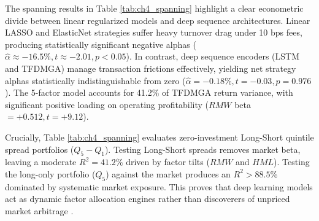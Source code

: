 \begin{table}[htbp]
\centering
\caption{Fama-French 5-Factor Spanning Regressions with Newey-West HAC Errors}
\label{tab:ch4_spanning}
\end{table}

The spanning results in Table \ref{tab:ch4_spanning} highlight a clear econometric divide between linear regularized models and deep sequence architectures. Linear LASSO and ElasticNet strategies suffer heavy turnover drag under 10 bps fees, producing statistically significant negative alphas ($\hat{\alpha} \approx -16.5\%, t \approx -2.01, p < 0.05$). In contrast, deep sequence encoders (LSTM and TFDMGA) manage transaction frictions effectively, yielding net strategy alphas statistically indistinguishable from zero ($\hat{\alpha} = -0.18\%, t = -0.03, p = 0.976$). The 5-factor model accounts for 41.2\% of TFDMGA return variance, with significant positive loading on operating profitability ($RMW$ beta $= +0.512, t = +9.12$).

Crucially, Table \ref{tab:ch4_spanning} evaluates zero-investment Long-Short quintile spread portfolios ($Q_5 - Q_1$). Testing Long-Short spreads removes market beta, leaving a moderate $R^2 = 41.2\%$ driven by factor tilts ($RMW$ and $HML$). Testing the long-only portfolio ($Q_5$) against the market produces an $R^2 > 88.5\%$ dominated by systematic market exposure. This proves that deep learning models act as dynamic factor allocation engines rather than discoverers of unpriced market arbitrage \citep{fama2015five, kelly2019characteristics}.
